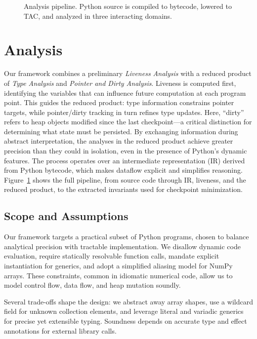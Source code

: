 \begin{figure}[t]
    \centering
    
    \caption{Analysis pipeline. Python source is compiled to bytecode, lowered to TAC, and analyzed in three interacting domains.}
    \label{fig:overview}
\end{figure}

\section{Analysis}
\label{sec:analysis}

Our framework combines a preliminary \emph{Liveness Analysis} with a reduced product of \emph{Type Analysis} and \emph{Pointer and Dirty Analysis}. Liveness is computed first, identifying the variables that can influence future computation at each program point. This guides the reduced product: type information constrains pointer targets, while pointer/dirty tracking in turn refines type updates. Here, ``dirty'' refers to heap objects modified since the last checkpoint—a critical distinction for determining what state must be persisted. By exchanging information during abstract interpretation, the analyses in the reduced product achieve greater precision than they could in isolation, even in the presence of Python’s dynamic features. The process operates over an intermediate representation (IR) derived from Python bytecode, which makes dataflow explicit and simplifies reasoning. Figure~\ref{fig:overview} shows the full pipeline, from source code through IR, liveness, and the reduced product, to the extracted invariants used for checkpoint minimization.


\subsection{Scope and Assumptions}
\label{sec:scope}

Our framework targets a practical subset of Python programs, chosen to balance analytical precision with tractable implementation.  
We disallow dynamic code evaluation, require statically resolvable function calls, mandate explicit instantiation for generics, and adopt a simplified aliasing model for NumPy arrays.  
These constraints, common in idiomatic numerical code, allow us to model control flow, data flow, and heap mutation soundly.

Several trade-offs shape the design: we abstract away array shapes, use a wildcard field for unknown collection elements, and leverage literal and variadic generics for precise yet extensible typing.  
Soundness depends on accurate type and effect annotations for external library calls.  

